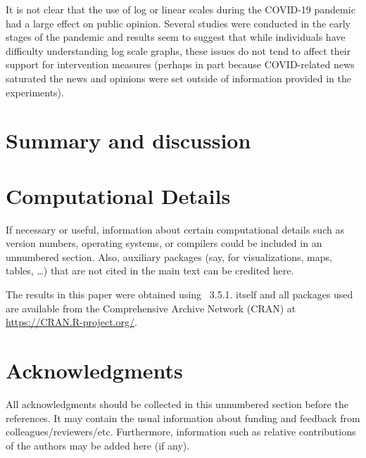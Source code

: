 \documentclass[article]{jdssv}\usepackage[]{graphicx}\usepackage[]{color}
\begin{document}

It is not clear that the use of log or linear scales during the COVID-19 pandemic had a large effect on public opinion. Several studies were conducted in the early stages of the pandemic \citep{romanoScaleCOVID19Graphs2020, seviLogarithmicLinearVisualizations2020, ryanGraphsLogarithmicAxes2020} and results seem to suggest that while individuals have difficulty understanding log scale graphs, these issues do not tend to affect their support for intervention measures (perhaps in part because COVID-related news saturated the news and opinions were set outside of information provided in the experiments). 


\section{Summary and discussion} \label{sec:summary}


\newpage
\section*{Computational Details}

If necessary or useful, information about certain computational details
such as version numbers, operating systems, or compilers could be included
in an unnumbered section. Also, auxiliary packages (say, for visualizations,
maps, tables, \dots) that are not cited in the main text can be credited here.


The results in this paper were obtained using
~3.5.1.  itself
and all packages used are available from the Comprehensive
 Archive Network (CRAN) at
\url{https://CRAN.R-project.org/}.


\section*{Acknowledgments}

All acknowledgments should be collected in this
unnumbered section before the references. It may contain the usual information
about funding and feedback from colleagues/reviewers/etc. Furthermore,
information such as relative contributions of the authors may be added here
(if any).


\end{document}
